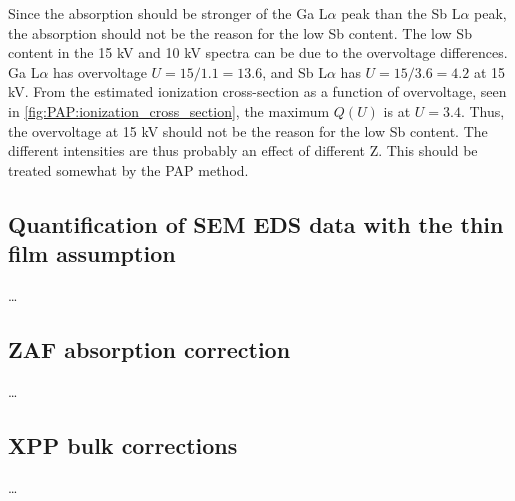 Since the absorption should be stronger of the Ga L$\alpha$ peak than the Sb L$\alpha$ peak, the absorption should not be the reason for the low Sb content.
The low Sb content in the 15 kV and 10 kV spectra can be due to the overvoltage differences.
Ga L$\alpha$ has overvoltage $U = 15/1.1 = 13.6$, and Sb L$\alpha$ has $U = 15/3.6 = 4.2$ at 15 kV.
From the estimated ionization cross-section as a function of overvoltage, seen in \cref{fig:PAP:ionization_cross_section}, the maximum $Q(U)$ is at $U = 3.4$.
Thus, the overvoltage at 15 kV should not be the reason for the low Sb content.
The different intensities are thus probably an effect of different Z. This should be treated somewhat by the PAP method.





\subsection{Quantification of SEM EDS data with the thin film assumption}
\label{discussion:bulk_corrections:thin_film_assumption}

\dots



\subsection{ZAF absorption correction}
\label{discussion:bulk_corrections:zaf_absorption_correction}

\dots




\subsection{XPP bulk corrections}
\label{discussion:bulk_corrections:xpp}

\dots


